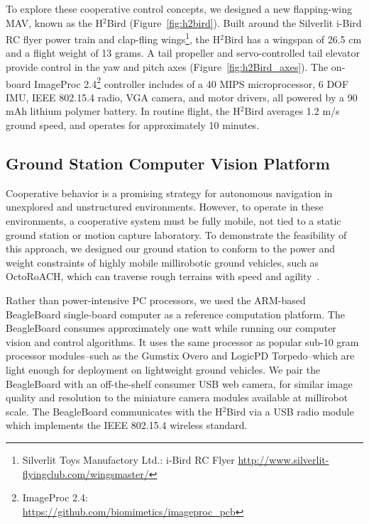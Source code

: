 \documentclass{aamas2013}
\begin{document}
To explore these cooperative control concepts, we designed a new 
flapping-wing MAV, known as the H$^2$Bird (Figure~\ref{fig:h2bird}). Built 
around the Silverlit i-Bird RC flyer power train and clap-fling wings\footnote{\raggedright Silverlit Toys Manufactory Ltd.: i-Bird RC Flyer
\href{http://www.silverlit-flyingclub.com/wingsmaster/}
     {http://www.silverlit-flyingclub.com/wingsmaster/}}, 
the H$^2$Bird has a wingspan of 26.5 cm and a flight weight of 13 grams. A 
tail propeller and servo-controlled tail elevator provide control in the yaw 
and pitch axes (Figure~\ref{fig:h2Bird_axes}). The on-board ImageProc 2.4\footnote{ImageProc 2.4: \\
\href{https://github.com/biomimetics/imageproc\_pcb}
     {https://github.com/biomimetics/imageproc\_pcb}} 
controller includes of a 40 MIPS microprocessor, 6 DOF IMU, 
IEEE 802.15.4 radio, VGA camera, and motor drivers, all powered by a 90 mAh 
lithium polymer battery. In routine flight, the H$^2$Bird averages 1.2 m/s 
ground speed, and operates for approximately 10 minutes.

\subsection{Ground Station Computer Vision Platform}
Cooperative behavior is a promising strategy for autonomous navigation in 
unexplored and unstructured environments. However, to operate in these 
environments, a cooperative system must be fully mobile, not tied to a 
static ground station or motion capture laboratory. To demonstrate the 
feasibility of this approach, we designed our ground station to conform to 
the power and weight constraints of highly mobile millirobotic ground 
vehicles, such as OctoRoACH, which can traverse rough terrains with speed and 
agility~\cite{Pullin2012Dynamic}. 

Rather than power-intensive PC processors, we used the ARM-based BeagleBoard 
single-board computer as a reference computation platform. The BeagleBoard 
consumes approximately one watt while running our computer vision and 
control algorithms. It uses the same processor as popular sub-10 gram 
processor modules--such as the Gumstix Overo and LogicPD Torpedo--which are 
light enough for deployment on lightweight ground vehicles. We pair the 
BeagleBoard with an off-the-shelf consumer USB web camera, for similar image 
quality and resolution to the miniature camera modules available at 
millirobot scale. The BeagleBoard communicates with the H$^2$Bird via a 
USB radio module which implements the IEEE 802.15.4 wireless standard.
\end{document}
